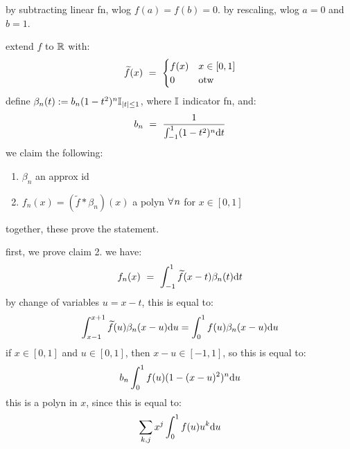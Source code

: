 \begin{pf}[source=Primary Source Material]
	by subtracting linear fn, wlog $f(a)=f(b)=0$.
	by rescaling, wlog $a=0$ and $b=1$.

	extend $f$ to $\mathbb{R}$ with:
	\begin{equation*}
		\widetilde{f}(x) \ = \
		\begin{cases}
			f(x) & x\in[0,1] \\ 0 & \textrm{otw}
		\end{cases}
	\end{equation*}
	define $\beta_{n}(t):=b_{n}(1-t^{2})^{n}\mathbb{I}_{\abs{t}\leq1}$,
	where $\mathbb{I}$ indicator fn, and:
	\begin{equation*}
		b_{n} \ = \ \frac{1}{\int_{-1}^{1}(1-t^{2})^{n}\textrm{d} t}
	\end{equation*}
	we claim the following:
	\begin{enumerate}[(1),itemsep=0pt]
		\item $\beta_{n}$ an approx id
		\item $f_{n}(x)=(\tilde{f}*\beta_{n})(x)$ a polyn $\fa n$ for $x\in[0,1]$
	\end{enumerate}
	together, these prove the statement.

	first, we prove claim 2. we have:
	\begin{equation*}
		f_{n}(x) \ = \ \int_{-1}^{1}\tilde{f}(x-t)\beta_{n}(t)\d t
	\end{equation*}
	by change of variables $u=x-t$, this is equal to:
	\begin{equation*}
		\int_{x-1}^{x+1}\widetilde{f}(u)\beta_{n}(x-u)\textrm{d} u
		= \int_{0}^{1}f(u)\beta_{n}(x-u)\textrm{d} u
	\end{equation*}
	if $x\in[0,1]$ and $u\in[0,1]$, then $x-u\in[-1,1]$, so this is equal to:
	\begin{equation*}
		b_{n}\int_{0}^{1}f(u)(1-(x-u)^{2})^{n}\textrm{d} u
	\end{equation*}
	this is a polyn in $x$, since this is equal to:
	\begin{equation*}
		\sum_{k,j}x^{j}\int_{0}^{1}f(u)u^{k}\textrm{d} u
	\end{equation*}


\end{pf}
